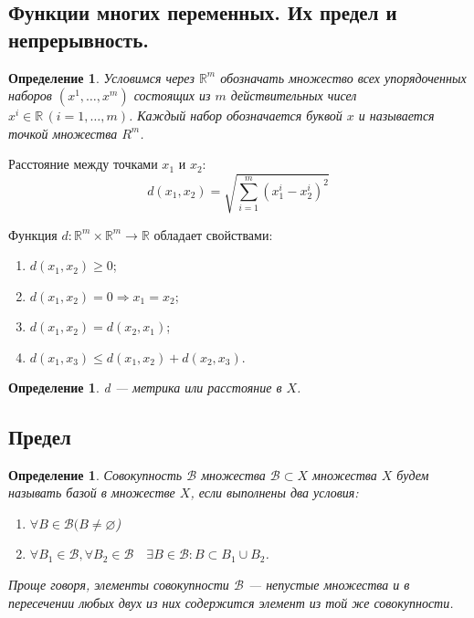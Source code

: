 \documentclass[12pt]{report}
\theoremstyle{plain}
\newtheorem{definition}[theorem]{Определение}
\newcommand{\R}{\mathbb R}
\newcommand{\B}{\mathcal B}
\begin{document}

\subsection{Функции многих переменных. Их предел и непрерывность.}

\begin{definition}
Условимся через $\R^m$ обозначать множество всех упорядоченных
наборов $(x^1, \dots, x^m)$ состоящих из $m$ действительных
чисел $x^i \in \R\,(i=1,\dots,m)$. Каждый набор обозначается буквой $x$
и называется точкой множества $R^m$.
\end{definition}

Расстояние между точками $x_1$ и $x_2$:
$$
d(x_1, x_2) = \sqrt{ \sum\limits_{i=1}^{m} (x_1^i - x_2^i)^2 }
$$

Функция $d: \R^m \times \R^m \rightarrow \R$ обладает свойствами:
\begin{enumerate}
\item $d(x_1, x_2) \ge 0$;
\item $d(x_1, x_2) = 0 \Rightarrow x_1 = x_2$;
\item $d(x_1, x_2) = d(x_2, x_1)$;
\item $d(x_1, x_3) \le d(x_1, x_2) + d(x_2, x_3).$
\end{enumerate}

\begin{definition}
d --- метрика или расстояние в $X$.
\end{definition}

\subsection{Предел}
\begin{definition}
Совокупность $\B$ множества $\B \subset X$ множества $X$ будем называть
базой в множестве $X$, если выполнены два условия:
\begin{enumerate}
\item $\forall B \in \B (B \ne \varnothing$)
\item $\forall B_1 \in \B, \forall B_2 \in \B \quad \exists B \in \B: B \subset B_1 \cup B_2$.
\end{enumerate}

Проще говоря, элементы совокупности $\B$ --- непустые множества и в пересечении любых
двух из них содержится элемент из той же совокупности.
\end{definition}
\end{document}
